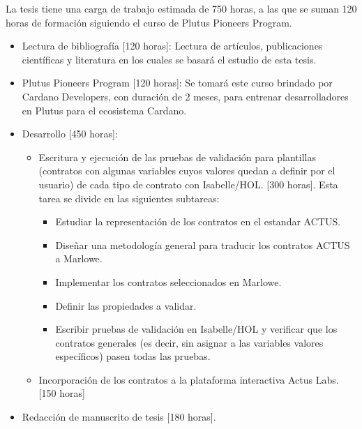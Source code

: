 \documentclass[12pt]{book}
\begin{document}
La tesis tiene una carga de trabajo estimada de 750 horas, a las que se suman 120 horas de formación siguiendo el curso de Plutus Pioneers Program.

\begin{itemize}
    \item Lectura de bibliografía [120 horas]: Lectura de artículos, publicaciones científicas y literatura en los cuales se basará el estudio de esta tesis.
    \item Plutus Pioneers Program [120 horas]: Se tomará este curso brindado por Cardano Developers, con duración de 2 meses, para entrenar desarrolladores en Plutus para el ecosistema Cardano.
    \item Desarrollo [450 horas]: 
    \begin{itemize}
    \item Escritura y ejecución de las pruebas de validación para plantillas (contratos con algunas variables cuyos valores quedan a definir por el usuario) de cada tipo de contrato con Isabelle/HOL. [300 horas]. Esta tarea se divide en las siguientes subtareas:
    \begin{itemize}
    \item Estudiar la representación de los contratos en el estandar ACTUS.
    \item Diseñar una metodología general para traducir los contratos ACTUS a Marlowe.
    \item Implementar los contratos seleccionados en Marlowe.
    \item Definir las propiedades a validar.
    \item Escribir pruebas de validación en Isabelle/HOL y verificar que los contratos generales (es decir, sin asignar a las variables valores específicos) pasen todas las pruebas. 
    \end{itemize}
    
    \item Incorporación de los contratos a la plataforma interactiva Actus Labs. [150 horas]
    \end{itemize}
\item Redacción de manuscrito de tesis [180 horas].%

\end{itemize}

\bigskip





\end{document}
